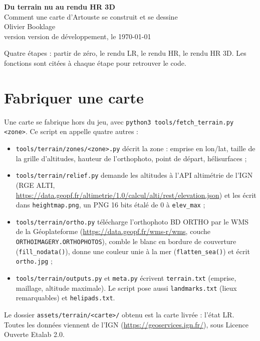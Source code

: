 \documentclass[a4paper,12pt]{article}
\newcommand{\code}[1]{\texttt{#1}}
\providecommand{\noticeversion}{version de développement}
\begin{document}
\begin{center}
  {\LARGE\bfseries Du terrain nu au rendu HR 3D}\\[0.5ex]
  {\large Comment une carte d'Artouste se construit et se dessine}\\[1ex]
  Olivier Booklage\\
  version \noticeversion{}, le \today
\end{center}

Quatre étapes : partir de zéro, le rendu LR, le rendu HR, le rendu HR 3D. Les
fonctions sont citées à chaque étape pour retrouver le code.

\section{Fabriquer une carte}

Une carte se fabrique hors du jeu, avec
\code{python3 tools/fetch\_terrain.py <zone>}. Ce script en appelle quatre
autres :

\begin{itemize}
  \item \code{tools/terrain/zones/<zone>.py} décrit la zone : emprise en
    lon/lat, taille de la grille d'altitudes, hauteur de l'orthophoto, point
    de départ, hélisurfaces ;
  \item \code{tools/terrain/relief.py} demande les altitudes à l'API
    altimétrie de l'IGN (RGE ALTI,
    \url{https://data.geopf.fr/altimetrie/1.0/calcul/alti/rest/elevation.json})
    et les écrit dans \code{heightmap.png}, un PNG 16 bits étalé de 0 à
    \code{elev\_max} ;
  \item \code{tools/terrain/ortho.py} télécharge l'orthophoto BD ORTHO par le
    WMS de la Géoplateforme (\url{https://data.geopf.fr/wms-r/wms}, couche
    \code{ORTHOIMAGERY.ORTHOPHOTOS}), comble le blanc en bordure de couverture
    (\code{fill\_nodata()}), donne une couleur unie à la mer
    (\code{flatten\_sea()}) et écrit \code{ortho.jpg} ;
  \item \code{tools/terrain/outputs.py} et \code{meta.py} écrivent
    \code{terrain.txt} (emprise, maillage, altitude maximale). Le script pose
    aussi \code{landmarks.txt} (lieux remarquables) et \code{helipads.txt}.
\end{itemize}

Le dossier \code{assets/terrain/<carte>/} obtenu est la carte livrée : l'état
LR. Toutes les données viennent de l'IGN
(\url{https://geoservices.ign.fr/}), sous Licence Ouverte Etalab 2.0.
\end{document}
